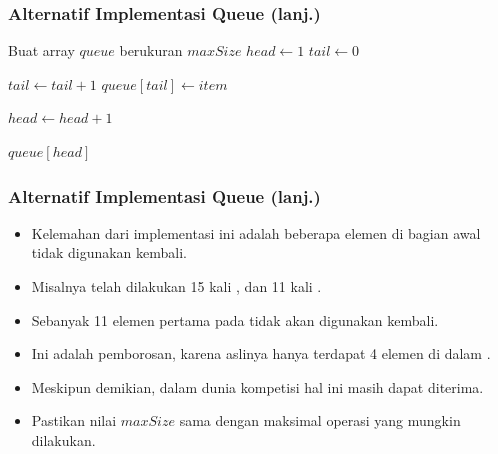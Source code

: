 \begin{frame}
\frametitle{Alternatif Implementasi Queue (lanj.)}
\begin{codebox}
\li \Comment Buat array $queue$ berukuran $maxSize$
\li $head \gets 1$
\li $tail \gets 0$
\end{codebox}

\begin{codebox}
\li $tail \gets tail + 1$
\li $queue[tail] \gets item$
\end{codebox}

\begin{codebox}
\li $head \gets head + 1$
\end{codebox}

\begin{codebox}
\li \Return $queue[head]$
\end{codebox}
\end{frame}

\begin{frame}
\frametitle{Alternatif Implementasi Queue (lanj.)}
\begin{itemize}
  \item Kelemahan dari implementasi ini adalah beberapa elemen di bagian awal  tidak digunakan kembali.
  \item Misalnya telah dilakukan 15 kali , dan 11 kali .
  \item Sebanyak 11 elemen pertama pada  tidak akan digunakan kembali.
  \item Ini adalah pemborosan, karena aslinya hanya terdapat 4 elemen di dalam .
  \item Meskipun demikian, dalam dunia kompetisi hal ini masih dapat diterima.
  \item Pastikan nilai $maxSize$ sama dengan maksimal operasi  yang mungkin dilakukan.
\end{itemize}
\end{frame}

